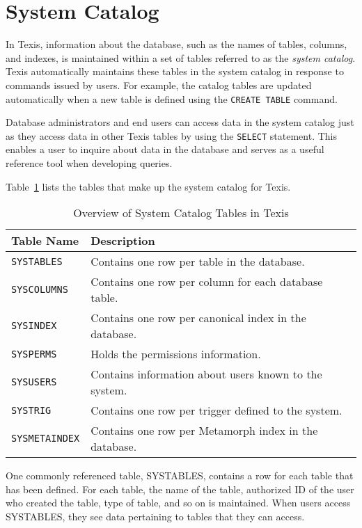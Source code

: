 \section{System Catalog}

In Texis, information about the database, such as the names of tables,
columns, and indexes, is maintained within a set of tables referred to
as the {\em system catalog}.  Texis automatically maintains these
tables in the system catalog in response to commands issued by users.
For example, the catalog tables are updated automatically when a new
table is defined using the {\tt CREATE TABLE} command.

Database administrators and end users can access data in the system
catalog just as they access data in other Texis tables by using the
\verb`SELECT` statement.  This enables a user to inquire about data in the
database and serves as a useful reference tool when developing
queries.

Table~\ref{tab:SysCat} lists the tables that make up the system
catalog for Texis.

\begin{table}
\caption{Overview of System Catalog Tables in Texis}{\label{tab:SysCat}}
\begin{center}
\begin{tabular}{|l|l|} \hline
Table Name          & Description  \\ \hline\hline
\verb`SYSTABLES`    & Contains one row per table in the database.   \\
\verb`SYSCOLUMNS`   & Contains one row per column for each database table.  \\
\verb`SYSINDEX`     & Contains one row per canonical index in the database. \\
\verb`SYSPERMS`     & Holds the permissions information. \\
\verb`SYSUSERS`     & Contains information about users known to the system. \\
\verb`SYSTRIG`      & Contains one row per trigger defined to the system. \\
\verb`SYSMETAINDEX` & Contains one row per Metamorph index in the database. \\ \hline
\end{tabular}
\end{center}
\end{table}

One commonly referenced table, SYSTABLES, contains a row for each
table that has been defined.  For each table, the name of the
table, authorized ID of the user who created the table, type of table,
and so on is maintained.  When users access SYSTABLES, they see data
pertaining to tables that they can access.

